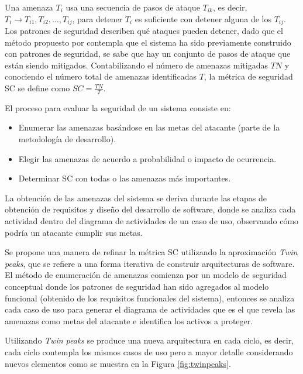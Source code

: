 Una amenaza $T_i$ usa una secuencia de pasos de ataque $T_{ik}$, es decir, $T_i \rightarrow T_{i1},T_{i2},...,T_{ij}$, para detener $T_i$ es suficiente con detener alguna de los  $T_{ij}$. Los patrones de seguridad describen qué ataques pueden detener, dado que el método propuesto por \cite{FerYosWas18} contempla que el sistema ha sido previamente construido con patrones de seguridad, se sabe que hay un conjunto de pasos de ataque que están siendo mitigados. Contabilizando el número de amenazas mitigadas $TN$ y conociendo el número total de amenazas identificadas $T$, la métrica de seguridad SC se define como $SC=\frac{TN}{T}$.

\vspace{0.3 cm}

El proceso para evaluar la seguridad de un sistema consiste en:

\begin{itemize}[noitemsep]
	\item Enumerar las amenazas basándose en las metas del atacante (parte de la metodología de desarrollo).
	\item Elegir las amenazas de acuerdo a probabilidad o impacto de ocurrencia. 
	\item Determinar SC con todas o las amenazas más importantes.
\end{itemize}

La obtención de las amenazas del sistema se deriva durante las etapas de obtención de requisitos y diseño del desarrollo de software, donde se analiza cada actividad dentro del diagrama de actividades de un caso de uso, observando cómo podría un atacante cumplir sus metas. 

\vspace{0.3 cm}

Se propone una manera de refinar la métrica SC utilizando la aproximación \textit{Twin peaks}, que se refiere a una forma iterativa de construir arquitecturas de software. El método de enumeración de amenazas comienza por un modelo de seguridad conceptual donde los patrones de seguridad han sido agregados al modelo funcional (obtenido de los requisitos funcionales del sistema), entonces se analiza cada caso de uso para generar el diagrama de actividades que es el que revela las amenazas como metas del atacante e identifica los activos a proteger. 

\vspace{0.3 cm}

Utilizando \textit{Twin peaks} se produce una nueva arquitectura en cada ciclo, es decir, cada ciclo contempla los mismos casos de uso pero a mayor detalle considerando nuevos elementos como se muestra en la Figura \ref{fig:twinpeaks}.

